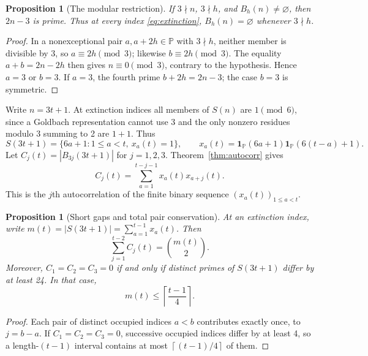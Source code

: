 \documentclass[11pt,a4paper]{article}
\newtheorem{proposition}[theorem]{Proposition}
\theoremstyle{definition}
\newcommand{\PP}{\mathbb P}
\newcommand{\one}{\mathbf 1}
\newcommand{\ceil}[1]{\left\lceil #1\right\rceil}
\begin{document}
\begin{proposition}[The modular restriction]\label{prop:mod3-selection}
If $3\nmid n$, $3\nmid h$, and $B_h(n)\ne\varnothing$, then $2n-3$ is prime. Thus at every index \eqref{eq:extinction}, $B_h(n)=\varnothing$ whenever $3\nmid h$.
\end{proposition}
\begin{proof}
In a nonexceptional pair $a,a+2h\in\PP$ with $3\nmid h$, neither member is divisible by 3, so $a\equiv2h\pmod3$; likewise $b\equiv2h\pmod3$. The equality $a+b=2n-2h$ then gives $n\equiv0\pmod3$, contrary to the hypothesis. Hence $a=3$ or $b=3$. If $a=3$, the fourth prime $b+2h=2n-3$; the case $b=3$ is symmetric.
\end{proof}

Write $n=3t+1$. At extinction indices all members of $S(n)$ are $1\pmod6$, since a Goldbach representation cannot use 3 and the only nonzero residues modulo 3 summing to 2 are $1+1$. Thus
\begin{equation}\label{eq:xt}
 S(3t+1)=\{6a+1:1\le a<t,\ x_a(t)=1\},\qquad
 x_a(t)=\one_{\PP}(6a+1)\one_{\PP}(6(t-a)+1).
\end{equation}
Let $C_j(t)=|B_{3j}(3t+1)|$ for $j=1,2,3$. Theorem~\ref{thm:autocorr} gives
\begin{equation}\label{eq:Cj}
 \boxed{C_j(t)=\sum_{a=1}^{t-j-1}x_a(t)x_{a+j}(t)}.
\end{equation}
This is the $j$th autocorrelation of the finite binary sequence $(x_a(t))_{1\le a<t}$.

\begin{proposition}[Short gaps and total pair conservation]\label{prop:pairconservation}
At an extinction index, write $m(t)=|S(3t+1)|=\sum_{a=1}^{t-1}x_a(t)$. Then
\begin{equation}\label{eq:conservation}
 \boxed{\sum_{j=1}^{t-2}C_j(t)=\binom{m(t)}2}.
\end{equation}
Moreover, $C_1=C_2=C_3=0$ if and only if distinct primes of $S(3t+1)$ differ by at least 24. In that case,
\begin{equation}\label{eq:packing}
 m(t)\le\ceil{\frac{t-1}{4}}.
\end{equation}
\end{proposition}
\begin{proof}
Each pair of distinct occupied indices $a<b$ contributes exactly once, to $j=b-a$. If $C_1=C_2=C_3=0$, successive occupied indices differ by at least 4, so a length-$(t-1)$ interval contains at most $\ceil{(t-1)/4}$ of them.
\end{proof}
\end{document}
